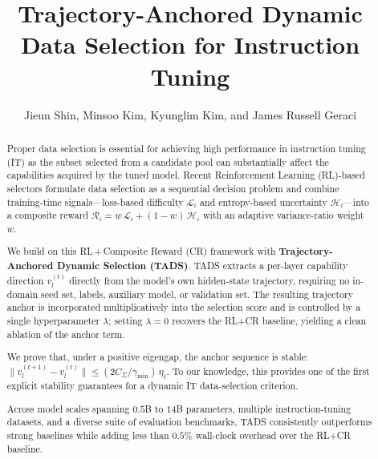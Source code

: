 \documentclass[sigconf,nonacm]{acmart}
\begin{document}
\title{Trajectory-Anchored Dynamic Data Selection
       for Instruction Tuning}

\author{Jieun Shin, Minsoo Kim, Kyunglim Kim, and James Russell Geraci}

\begin{abstract}
Proper data selection is essential for achieving high performance in
instruction tuning (IT) as the subset selected from a candidate pool
can substantially affect the capabilities acquired by the tuned
model. Recent Reinforcement Learning (RL)-based selectors formulate
data selection as a sequential decision problem and combine
training-time signals---loss-based difficulty $\mathcal{L}_i$ and
entropy-based uncertainty $\mathcal{H}_i$---into a composite reward
$\mathcal{R}_i = w\,\mathcal{L}_i + (1-w)\,\mathcal{H}_i$
with an adaptive variance-ratio weight~$w$.

We build on this RL\,+\,Composite Reward (CR) framework with
\textbf{Trajectory-Anchored Dynamic Selection (TADS)}. TADS extracts
a per-layer capability direction $v_l^{(t)}$ directly from the
model's own hidden-state trajectory, requiring no in-domain seed
set, labels, auxiliary model, or validation set. The resulting
trajectory anchor is incorporated multiplicatively into the
selection score and is controlled by a single hyperparameter
$\lambda$; setting $\lambda=0$ recovers the RL+CR baseline, yielding
a clean ablation of the anchor term.

We prove that, under a positive eigengap, the anchor sequence is
stable:
$\|v_l^{(t+1)} - v_l^{(t)}\| \le
(2C_\Sigma/\gamma_{\min})\,\eta_t$.
To our knowledge, this provides one of the first explicit stability
guarantees for a dynamic IT data-selection criterion.

Across model scales spanning $0.5$B to $14$B parameters, multiple
instruction-tuning datasets, and a diverse suite of evaluation
benchmarks, TADS consistently outperforms strong baselines while
adding less than $0.5\%$ wall-clock overhead over the RL+CR
baseline.
\end{abstract}


\maketitle
\end{document}
